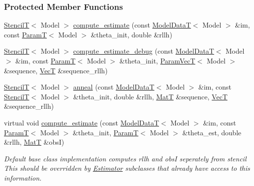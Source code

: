 \subsubsection*{Protected Member Functions}
\begin{DoxyCompactItemize}
\item 
\hyperlink{namespacemappel_a3a06598240007876f8c4bf834ad86197}{StencilT}$<$ Model $>$ \hyperlink{classmappel_1_1SimulatedAnnealingMaximizer_a8a0c6b0ee9c50254b71577ddb191122b}{compute\+\_\+estimate} (const \hyperlink{namespacemappel_a97f050df953605381ae9c901c3b125f1}{Model\+DataT}$<$ Model $>$ \&im, const \hyperlink{namespacemappel_a667925cb0d6c0e49f2f035cc5a9a6857}{ParamT}$<$ Model $>$ \&theta\+\_\+init, double \&rllh)
\item 
\hyperlink{namespacemappel_a3a06598240007876f8c4bf834ad86197}{StencilT}$<$ Model $>$ \hyperlink{classmappel_1_1SimulatedAnnealingMaximizer_a146eedb2f0e4b4a6839c16b288ab7f75}{compute\+\_\+estimate\+\_\+debug} (const \hyperlink{namespacemappel_a97f050df953605381ae9c901c3b125f1}{Model\+DataT}$<$ Model $>$ \&im, const \hyperlink{namespacemappel_a667925cb0d6c0e49f2f035cc5a9a6857}{ParamT}$<$ Model $>$ \&theta\+\_\+init, \hyperlink{namespacemappel_a0f86d3153e4e27b095012f140eea58de}{Param\+VecT}$<$ Model $>$ \&sequence, \hyperlink{namespacemappel_a2225ad69f358daa3f4f99282a35b9a3a}{VecT} \&sequence\+\_\+rllh)
\item 
\hyperlink{namespacemappel_a3a06598240007876f8c4bf834ad86197}{StencilT}$<$ Model $>$ \hyperlink{classmappel_1_1SimulatedAnnealingMaximizer_a90132981350dc35facb8c292493ada74}{anneal} (const \hyperlink{namespacemappel_a97f050df953605381ae9c901c3b125f1}{Model\+DataT}$<$ Model $>$ \&im, const \hyperlink{namespacemappel_a3a06598240007876f8c4bf834ad86197}{StencilT}$<$ Model $>$ \&theta\+\_\+init, double \&rllh, \hyperlink{namespacemappel_a7091ab87c528041f7e2027195fad8915}{MatT} \&sequence, \hyperlink{namespacemappel_a2225ad69f358daa3f4f99282a35b9a3a}{VecT} \&sequence\+\_\+rllh)
\item 
virtual void \hyperlink{classmappel_1_1Estimator_aa46d86cfb5c336c9cb8c106da036d7d1}{compute\+\_\+estimate} (const \hyperlink{namespacemappel_a97f050df953605381ae9c901c3b125f1}{Model\+DataT}$<$ Model $>$ \&im, const \hyperlink{namespacemappel_a667925cb0d6c0e49f2f035cc5a9a6857}{ParamT}$<$ Model $>$ \&theta\+\_\+init, \hyperlink{namespacemappel_a667925cb0d6c0e49f2f035cc5a9a6857}{ParamT}$<$ Model $>$ \&theta\+\_\+est, double \&rllh, \hyperlink{namespacemappel_a7091ab87c528041f7e2027195fad8915}{MatT} \&obsI)
\begin{DoxyCompactList}\small\item\em Default base class implementation computes rllh and obsI seperately from stencil This should be overridden by \hyperlink{classmappel_1_1Estimator}{Estimator} subclasses that already have access to this information. \end{DoxyCompactList}\item 

\end{DoxyCompactItemize}
